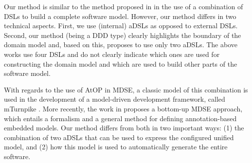 Our method is similar to the method proposed in \cite{warmer_model_2007, warmer_building_2006} in the use of a combination of DSLs to build a complete software model. 
%
However, our method differs in two technical aspects. 
First, we use (internal) aDSLs as opposed to external DSLs. Second, our method (being a DDD type) clearly highlights the boundary of the domain model and, based on this, proposes to use only two aDSLs. The above works use four DSLs and do not clearly indicate which ones are used for constructing the domain model and which are used to build other parts of the software model. 


With regards to the use of AtOP in MDSE, a classic model of this combination is used in the development of a model-driven development framework, called mTurnpike \cite{wada_modeling_2005}. 
%
More recently, the work in \cite{balz_embedding_2012} proposes a bottom-up MDSE approach, which entails a formalism and a general method for defining annotation-based embedded models. 
%
Our method differs from both \cite{wada_modeling_2005,balz_embedding_2012} in two important ways: 
(1) the combination of two aDSLs that can be used to express the configured unified model, and (2) how this model is used to automatically generate the entire software. 